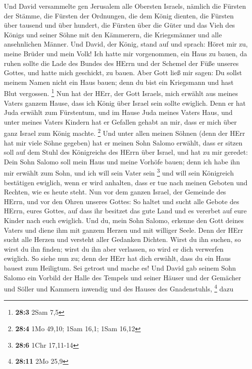  Und David versammelte gen Jerusalem alle Obersten
Israels, nämlich die Fürsten der Stämme, die Fürsten der Ordnungen, die
dem König dienten, die Fürsten über tausend und über hundert, die
Fürsten über die Güter und das Vieh des Königs und seiner Söhne mit den
Kämmerern, die Kriegsmänner und alle ansehnlichen Männer. 
Und David, der König, stand auf und sprach: Höret mir zu, meine Brüder
und mein Volk! Ich hatte mir vorgenommen, ein Haus zu bauen, da ruhen
sollte die Lade des Bundes des HErrn und der Schemel der Füße unseres
Gottes, und hatte mich geschickt, zu bauen.  Aber Gott
ließ mir sagen: Du sollst meinem Namen nicht ein Haus bauen; denn du
bist ein Kriegsmann und hast Blut vergossen. \footnote{\textbf{28:3}
  2Sam 7,5}  Nun hat der HErr, der Gott Israels, mich
erwählt aus meines Vaters ganzem Hause, dass ich König über Israel sein
sollte ewiglich. Denn er hat Juda erwählt zum Fürstentum, und im Hause
Juda meines Vaters Haus, und unter meines Vaters Kindern hat er Gefallen
gehabt an mir, dass er mich über ganz Israel zum König machte.
\footnote{\textbf{28:4} 1Mo 49,10; 1Sam 16,1; 1Sam 16,12} 
Und unter allen meinen Söhnen (denn der HErr hat mir viele Söhne
gegeben) hat er meinen Sohn Salomo erwählt, dass er sitzen soll auf dem
Stuhl des Königreichs des HErrn über Israel,  und hat zu
mir geredet: Dein Sohn Salomo soll mein Haus und meine Vorhöfe bauen;
denn ich habe ihn mir erwählt zum Sohn, und ich will sein Vater sein
\footnote{\textbf{28:6} 1Chr 17,11-14}  und will sein
Königreich bestätigen ewiglich, wenn er wird anhalten, dass er tue nach
meinen Geboten und Rechten, wie es heute steht.  Nun vor
dem ganzen Israel, der Gemeinde des HErrn, und vor den Ohren unseres
Gottes: So haltet und sucht alle Gebote des HErrn, eures Gottes, auf
dass ihr besitzet das gute Land und es vererbet auf eure Kinder nach
euch ewiglich.  Und du, mein Sohn Salomo, erkenne den Gott
deines Vaters und diene ihm mit ganzem Herzen und mit williger Seele.
Denn der HErr sucht alle Herzen und versteht aller Gedanken Dichten.
Wirst du ihn suchen, so wirst du ihn finden; wirst du ihn aber
verlassen, so wird er dich verwerfen ewiglich.  So siehe
nun zu; denn der HErr hat dich erwählt, dass du ein Haus bauest zum
Heiligtum. Sei getrost und mache es!  Und David gab
seinem Sohn Salomo ein Vorbild der Halle des Tempels und seiner Häuser
und der Gemächer und Söller und Kammern inwendig und des Hauses des
Gnadenstuhls, \footnote{\textbf{28:11} 2Mo 25,9}  dazu
